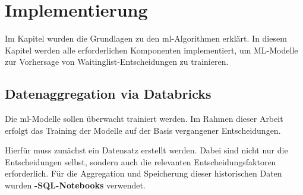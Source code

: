 \chapter{Implementierung}
Im Kapitel  wurden die Grundlagen zu den \gls{ml}-Algorithmen erklärt.  
In diesem Kapitel werden alle erforderlichen Komponenten implementiert, um ML-Modelle zur Vorhersage von Waitinglist-Entscheidungen zu trainieren.
\section{Datenaggregation via Databricks}
Die \gls{ml}-Modelle sollen überwacht trainiert werden.  
Im Rahmen dieser Arbeit erfolgt das Training der Modelle auf der Basis vergangener Entscheidungen.



Hierfür muss zunächst ein Datensatz erstellt werden. 
Dabei sind nicht nur die Entscheidungen selbst, sondern auch die relevanten Entscheidungsfaktoren erforderlich.
Für die Aggregation und Speicherung dieser historischen Daten wurden \textbf{-SQL-Notebooks} verwendet.





